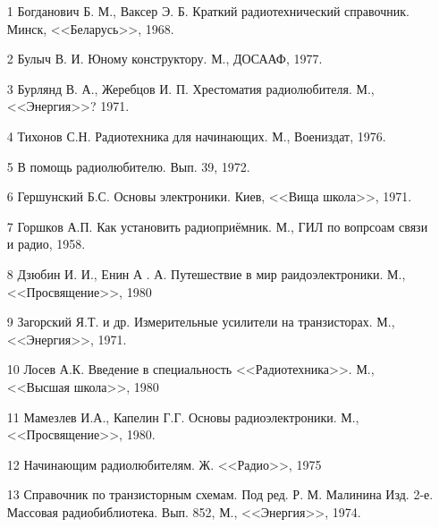 \documentclass[12pt]{article}
\begin{document}
\begin{itemize}
\item[1] Богданович Б. М., Ваксер Э. Б. Краткий радиотехнический справочник. Минск, <<Беларусь>>, 1968.
\item[2] Булыч В. И. Юному конструктору. М., ДОСААФ, 1977.
\item[3] Бурлянд В. А., Жеребцов И. П. Хрестоматия радиолюбителя. М., <<Энергия>>? 1971.
\item[4] Тихонов С.Н. Радиотехника для начинающих. М., Воениздат, 1976.
\item[5] В помощь радиолюбителю. Вып. 39, 1972.
\item[6] Гершунский Б.С. Основы электроники. Киев, <<Вища школа>>, 1971.
\item[7] Горшков А.П. Как установить радиоприёмник. М., ГИЛ по вопрсоам связи и радио, 1958.
\item[8] Дзюбин  И. И., Енин А . А. Путешествие в мир раидоэлектроники. М., <<Просвящение>>, 1980
\item[9] Загорский Я.Т. и др. Измерительные усилители на транзисторах. М., <<Энергия>>, 1971.
\item[10] Лосев А.К. Введение в  специальность <<Радиотехника>>. М., <<Высшая школа>>, 1980
\item[11] Мамезлев И.А., Капелин Г.Г. Основы радиоэлектроники. М., <<Просвящение>>, 1980.
\item[12] Начинающим радиолюбителям. Ж. <<Радио>>, 1975
\item[13] Справочник по транзисторным схемам. Под ред. Р. М. Малинина Изд. 2-е. Массовая радиобиблиотека. Вып. 852, М., <<Энергия>>, 1974.
\end{itemize}

\newpage


\tableofcontents
\end{document}
